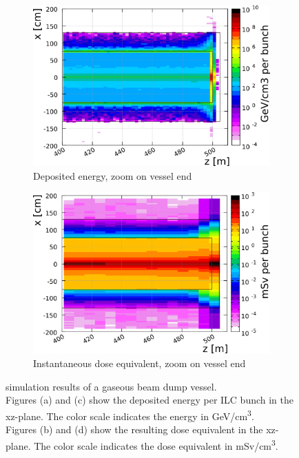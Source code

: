 \begin{figure}[!h]
\begin{subfigure}[b]{0.49\textwidth}
    \includegraphics[width=\textwidth]{Figures/BeamDump/Gasdump/Energy_zoom.png}
   \caption{Deposited energy, zoom on vessel end}
   \end{subfigure}
   \hfill
   \begin{subfigure}[b]{0.49\textwidth}
   \centering
    \includegraphics[width=\textwidth]{Figures/BeamDump/Gasdump/Dose_eq_zoom.png}
   \caption{Instantaneous dose equivalent, zoom on vessel end}
   \end{subfigure}
   \caption[Deposited energy and dose equivalent in a gaseous beam dump]{
   \fluka simulation results of a gaseous beam dump vessel.
   \\Figures (a) and (c) show the deposited energy per ILC bunch in the xz-plane.
   The color scale indicates the energy in \si[detect-all]{\GeV}/\si{\centi\meter\cubed}.
   \\Figures (b) and (d) show the resulting dose equivalent in the xz-plane.
   The color scale indicates the dose equivalent in \si[detect-all]{\milli\sievert}/\si{\centi\meter\cubed}.}
   \label{fig:BeamDumps:GasDump}
\end{figure} 

